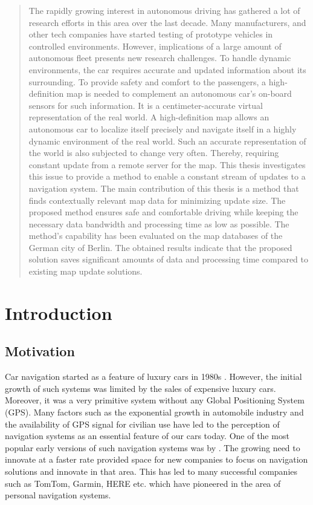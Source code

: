 \begin{abstract}
The rapidly growing interest in autonomous driving has gathered a lot of research efforts in this area over the last decade. Many manufacturers, and other tech companies have started testing of prototype vehicles in controlled environments. However, implications of a large amount of autonomous fleet presents new research challenges. To handle dynamic environments, the car requires accurate and updated information about its surrounding. To provide safety and comfort to the passengers, a high-definition map is needed to complement an autonomous car's on-board sensors for such information. It is a centimeter-accurate virtual representation of the real world. A high-definition map allows an autonomous car to localize itself precisely and navigate itself in a highly dynamic environment of the real world. Such an accurate representation of the world is also subjected to change very often. Thereby, requiring constant update from a remote server for the map. This thesis investigates this issue to provide a method to enable a constant stream of updates to a navigation system. The main contribution of this thesis is a method that finds contextually relevant map data for minimizing update size. The proposed method ensures safe and comfortable driving while keeping the necessary data bandwidth and processing time as low as possible. The method's capability has been evaluated on the map databases of the German city of Berlin. The obtained results indicate that the proposed solution saves significant amounts of data and processing time compared to existing map update solutions.
\end{abstract}



\chapter{Introduction} \label{ch:introduction}
\section{Motivation} \label{motivation}
Car navigation started as a feature of luxury cars in 1980s \cite{schaminee2011short}. However, the initial growth of such systems was limited by the sales of expensive luxury cars. Moreover, it was a very primitive system without any Global Positioning System (GPS). Many factors such as the exponential growth in automobile industry and the availability of GPS signal for civilian use have led to the perception of navigation systems as an essential feature of our cars today. One of the most popular early versions of such navigation systems was by \citet{ishikawa1991map}. The growing need to innovate at a faster rate provided space for new companies to focus on navigation solutions and innovate in that area. This has led to many successful companies such as TomTom, Garmin, HERE etc. which have pioneered in the area of personal navigation systems.\\

